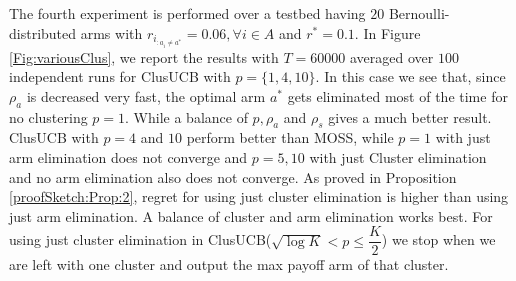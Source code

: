 The fourth experiment is performed over a testbed having $20$ Bernoulli-distributed arms with $r_{i_{:{a_{i}\neq a^{*}}}}=0.06,\forall i\in A$ and $r^{*}=0.1$. In Figure \ref{Fig:variousClus}, we report the results with $T=60000$ averaged over $100$ independent runs for ClusUCB with  $p=\lbrace 1,4,10\rbrace$. In this case we see that, since $\rho_{a}$ is decreased very fast, the optimal arm $a^{*}$ gets eliminated most of the time for no clustering $p=1$. While a balance of $p,\rho_{a}$ and $\rho_{s}$ gives a much better result. ClusUCB with $p=4$ and $10$ perform better than MOSS, while $p=1$ with just arm elimination does not converge and $p=5,10$ with just Cluster elimination and no arm elimination also does not converge. As proved in Proposition \ref{proofSketch:Prop:2}, regret for using just cluster elimination is higher than using just arm elimination. A balance of cluster and arm elimination works best. For using just 
cluster elimination in ClusUCB($\sqrt{\log K}<p\leq \dfrac{K}{2}$) we stop when we are left with one cluster and output the max payoff arm of that cluster.


